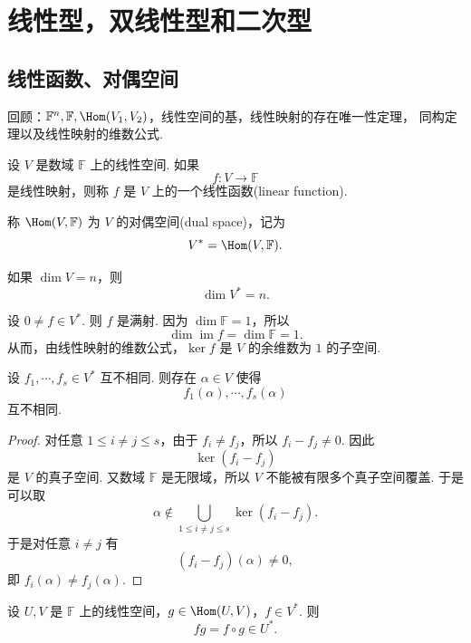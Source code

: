 \setchapterintro{}
\chapter{线性型，双线性型和二次型}


\section{线性函数、对偶空间}

回顾：$\mathbb{F}^n,\mathbb{F},\Hom(V_1,V_2)$，线性空间的基，线性映射的存在唯一性定理，
同构定理以及线性映射的维数公式.

\begin{definition}\label{p1:concept:c7-l12}
	设 $V$ 是数域 $\mathbb{F}$ 上的线性空间. 如果
	\[
	f:V\longrightarrow \mathbb{F}
	\]
	是线性映射，则称 $f$ 是 $V$ 上的一个线性函数(linear function).
	
	称 $\Hom(V,\mathbb{F})$ 为 $V$ 的对偶空间(dual space)，记为
	\[
	V^*=\Hom(V,\mathbb{F}).
	\]
\end{definition}

\begin{example}
	如果 $\dim V=n$，则
	\[
	\dim V^*=n.
	\]
\end{example}

\begin{example}
	设 $0\ne f\in V^*$. 则 $f$ 是满射. 因为 $\dim \mathbb{F}=1$，所以
	\[
	\dim \operatorname{im} f=\dim \mathbb{F}=1.
	\]
	从而，由线性映射的维数公式，$\ker f$ 是 $V$ 的余维数为 $1$ 的子空间.
\end{example}

\begin{example}
	设 $f_1,\cdots,f_s\in V^*$ 互不相同. 则存在 $\alpha\in V$ 使得
	\[
	f_1(\alpha),\cdots,f_s(\alpha)
	\]
	互不相同.
\end{example}

\begin{proof}
	对任意 $1\leq i\ne j\leq s$，由于 $f_i\ne f_j$，所以 $f_i-f_j\ne 0$. 因此
	\[
	\ker(f_i-f_j)
	\]
	是 $V$ 的真子空间. 又数域 $\mathbb{F}$ 是无限域，所以 $V$ 不能被有限多个真子空间覆盖.
	于是可以取
	\[
	\alpha\notin \bigcup_{1\leq i\ne j\leq s}\ker(f_i-f_j).
	\]
	于是对任意 $i\ne j$ 有
	\[
	(f_i-f_j)(\alpha)\ne0,
	\]
	即 $f_i(\alpha)\ne f_j(\alpha)$.
\end{proof}

\begin{example}
	设 $U,V$ 是 $\mathbb{F}$ 上的线性空间，$g\in \Hom(U,V)$，$f\in V^*$. 则
	\[
	fg=f\circ g\in U^*.
	\]
\end{example}

